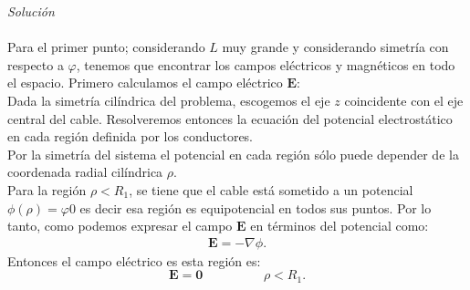 \documentclass[11pt,fleqn]{book} %
\begin{document}
\begin{example}
\emph{Soluci\'on}\\\\
Para el primer punto; considerando $L$ muy grande y considerando simetr\'ia con respecto a $\varphi$, tenemos que encontrar los campos el\'ectricos y magn\'eticos en todo el espacio. Primero calculamos el campo el\'ectrico $\textbf{E}$:\\
Dada la simetr\'ia cil\'indrica del problema, escogemos el eje $z$ coincidente con el eje central del cable. Resolveremos entonces la ecuaci\'on del potencial electrost\'atico en cada regi\'on definida por los conductores.\\Por la simetr\'ia del sistema el potencial en cada regi\'on s\'olo puede depender de la coordenada radial cil\'indrica $\rho$.\\
Para la regi\'on $\rho < R_{1}$, se tiene que el cable est\'a sometido a un potencial $\phi(\rho)=\varphi{0}$ es decir esa regi\'on es equipotencial en todos sus puntos. Por lo tanto, como podemos expresar el campo $\textbf{E}$ en t\'erminos del potencial como:
\begin{eqnarray*}
\textbf{E}=-\nabla\phi.
\end{eqnarray*}
Entonces el campo el\'ectrico es esta regi\'on es:
\begin{equation}
\textbf{E}=\textbf{0} \hspace{2cm}  \rho < R_{1}.  \label{E}
\end{equation}


\end{example}
\end{document}
